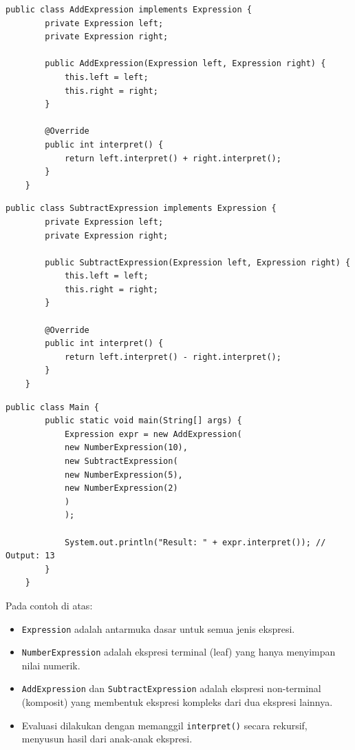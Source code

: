 \begin{lstlisting}[style=JavaStyle, caption={Ekspresi Penjumlahan}, label={lst:interpreter-plus}]
	public class AddExpression implements Expression {
		private Expression left;
		private Expression right;
		
		public AddExpression(Expression left, Expression right) {
			this.left = left;
			this.right = right;
		}
		
		@Override
		public int interpret() {
			return left.interpret() + right.interpret();
		}
	}
\end{lstlisting}

\begin{lstlisting}[style=JavaStyle, caption={Ekspresi Pengurangan}, label={lst:interpreter-minus}]
	public class SubtractExpression implements Expression {
		private Expression left;
		private Expression right;
		
		public SubtractExpression(Expression left, Expression right) {
			this.left = left;
			this.right = right;
		}
		
		@Override
		public int interpret() {
			return left.interpret() - right.interpret();
		}
	}
\end{lstlisting}

\begin{lstlisting}[style=JavaStyle, caption={Client: Evaluasi Ekspresi}, label={lst:interpreter-main}]
	public class Main {
		public static void main(String[] args) {
			Expression expr = new AddExpression(
			new NumberExpression(10),
			new SubtractExpression(
			new NumberExpression(5),
			new NumberExpression(2)
			)
			);
			
			System.out.println("Result: " + expr.interpret()); // Output: 13
		}
	}
\end{lstlisting}

Pada contoh di atas:
\begin{itemize}
	\item \texttt{Expression} adalah antarmuka dasar untuk semua jenis ekspresi.
	\item \texttt{NumberExpression} adalah ekspresi terminal (leaf) yang hanya menyimpan nilai numerik.
	\item \texttt{AddExpression} dan \texttt{SubtractExpression} adalah ekspresi non-terminal (komposit) yang membentuk ekspresi kompleks dari dua ekspresi lainnya.
	\item Evaluasi dilakukan dengan memanggil \texttt{interpret()} secara rekursif, menyusun hasil dari anak-anak ekspresi.
\end{itemize}

